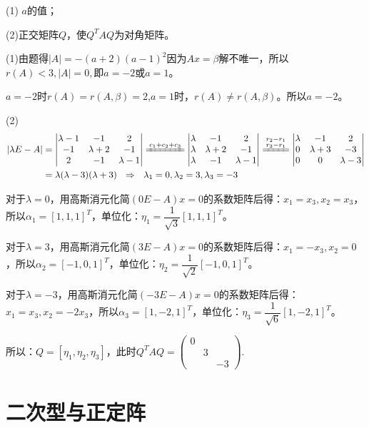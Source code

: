 \documentclass[a4paper]{report}
\begin{document}
(1) $a$的值；

(2)正交矩阵$Q$，使$Q^TAQ$为对角矩阵。

\begin{jie}
(1)由题得$|A|=-(a+2)(a-1)^2$因为$Ax=\beta$解不唯一，所以$r(A)<3,|A|=0,$即$a=-2$或$a=1$。

$a=-2$时$r(A)=r(A,\beta)=2$,$a=1$时，$r(A)\neq r(A,\beta)$。所以$a=-2$。

(2)
\begin{align*}
|\lambda E-A|&=
\begin{vmatrix}
\lambda -1&-1&2\\
-1&\lambda+2&-1\\
2&-1&\lambda -1
\end{vmatrix}
\xlongequal{c_1+c_2+c_3}
\begin{vmatrix}
\lambda&-1&2\\
\lambda&\lambda+2&-1\\
\lambda&-1&\lambda -1
\end{vmatrix}\xlongequal{\substack{r_2-r_1\\ r_3-r_1}}
\begin{vmatrix}
\lambda&-1&2\\
0&\lambda+3&-3\\
0&0&\lambda -3
\end{vmatrix}\\&=\lambda(\lambda-3)(\lambda+3)~~\Rightarrow~~\lambda_1=0,\lambda_2=3,\lambda_3=-3
\end{align*}

对于$\lambda=0$，用高斯消元化简$(0E-A)x=0$的系数矩阵后得：$x_1=x_3,x_2=x_3$，所以$\alpha_1=[1,1,1]^T$，单位化：$\eta_1=\dfrac{1}{\sqrt{3}}[1,1,1]^T$。

对于$\lambda=3$，用高斯消元化简$(3E-A)x=0$的系数矩阵后得：$x_1=-x_3,x_2=0$，所以$\alpha_2=[-1,0,1]^T$，单位化：$\eta_2=\dfrac{1}{\sqrt{2}}[-1,0,1]^T$。

对于$\lambda=-3$，用高斯消元化简$(-3E-A)x=0$的系数矩阵后得：$x_1=x_3,x_2=-2x_3$，所以$\alpha_3=[1,-2,1]^T$，单位化：$\eta_3=\dfrac{1}{\sqrt{6}}[1,-2,1]^T$。

所以：$Q=[\eta_1,\eta_2,\eta_3]$，此时$Q^TAQ=
\begin{pmatrix}
0\\&3\\&&-3
\end{pmatrix}
$.
\end{jie}

\chapter{二次型与正定阵}
\end{document}
